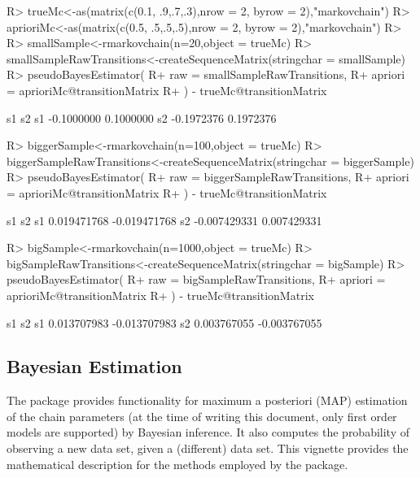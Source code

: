 \documentclass[
  nojss]{jss}
\begin{document}
\begin{CodeChunk}

\begin{CodeInput}
R> trueMc<-as(matrix(c(0.1, .9,.7,.3),nrow = 2, byrow = 2),"markovchain")
R> aprioriMc<-as(matrix(c(0.5, .5,.5,.5),nrow = 2, byrow = 2),"markovchain")
R> 
R> smallSample<-rmarkovchain(n=20,object = trueMc)
R> smallSampleRawTransitions<-createSequenceMatrix(stringchar = smallSample)
R> pseudoBayesEstimator(
R+   raw = smallSampleRawTransitions, 
R+   apriori = aprioriMc@transitionMatrix
R+ ) - trueMc@transitionMatrix
\end{CodeInput}

\begin{CodeOutput}
           s1        s2
s1 -0.1000000 0.1000000
s2 -0.1972376 0.1972376
\end{CodeOutput}

\begin{CodeInput}
R> biggerSample<-rmarkovchain(n=100,object = trueMc)
R> biggerSampleRawTransitions<-createSequenceMatrix(stringchar = biggerSample)
R> pseudoBayesEstimator(
R+   raw = biggerSampleRawTransitions,
R+   apriori = aprioriMc@transitionMatrix
R+ ) - trueMc@transitionMatrix
\end{CodeInput}

\begin{CodeOutput}
             s1           s2
s1  0.019471768 -0.019471768
s2 -0.007429331  0.007429331
\end{CodeOutput}

\begin{CodeInput}
R> bigSample<-rmarkovchain(n=1000,object = trueMc)
R> bigSampleRawTransitions<-createSequenceMatrix(stringchar = bigSample)
R> pseudoBayesEstimator(
R+   raw = bigSampleRawTransitions,
R+   apriori = aprioriMc@transitionMatrix
R+ ) - trueMc@transitionMatrix
\end{CodeInput}

\begin{CodeOutput}
            s1           s2
s1 0.013707983 -0.013707983
s2 0.003767055 -0.003767055
\end{CodeOutput}
\end{CodeChunk}

\hypertarget{bayesian-estimation}{%
\subsection{Bayesian Estimation}\label{bayesian-estimation}}

The  package provides functionality for maximum a posteriori (MAP) estimation of the chain parameters (at the time of writing this document, only first order models are supported) by Bayesian inference. It also computes the probability of observing a new data set, given a (different) data set. This vignette provides the mathematical description for the methods employed by the package.
\end{document}
